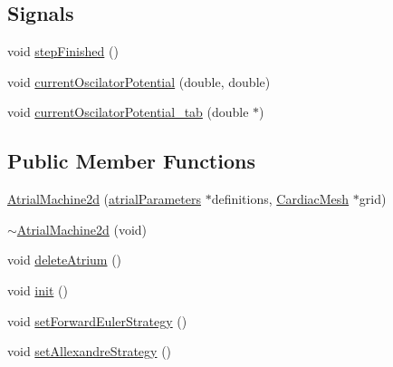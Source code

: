 \subsection*{Signals}
\begin{DoxyCompactItemize}
\item 
void \hyperlink{class_atrial_machine2d_aa0503c0b65de1d0a3353fa60001b7c7b}{step\+Finished} ()
\item 
void \hyperlink{class_atrial_machine2d_ab95917c203cf726da282efcfb26241a3}{current\+Oscilator\+Potential} (double, double)
\item 
void \hyperlink{class_atrial_machine2d_a8a2f2c40ae228ee8a2cf6f7457acfd28}{current\+Oscilator\+Potential\+\_\+tab} (double $\ast$)
\end{DoxyCompactItemize}
\subsection*{Public Member Functions}
\begin{DoxyCompactItemize}
\item 
\hyperlink{class_atrial_machine2d_a1181b8a58b70e0374cfaefcbf2c29b12}{Atrial\+Machine2d} (\hyperlink{classatrial_parameters}{atrial\+Parameters} $\ast$definitions, \hyperlink{class_cardiac_mesh}{Cardiac\+Mesh} $\ast$grid)
\item 
\hyperlink{class_atrial_machine2d_a955b6614307d86c8d9e196a3b7ce2434}{$\sim$\+Atrial\+Machine2d} (void)
\item 
void \hyperlink{class_atrial_machine2d_a40366613671e5856d0c3cd0572398dc1}{delete\+Atrium} ()
\item 
void \hyperlink{class_atrial_machine2d_a22a0e5a3d07859721cce24ed253932ed}{init} ()
\item 
void \hyperlink{class_atrial_machine2d_ab4833c86a56f23867915d876fac581e0}{set\+Forward\+Euler\+Strategy} ()
\item 
void \hyperlink{class_atrial_machine2d_af808c57f5af0c0c26aadcf4c812cb21f}{set\+Allexandre\+Strategy} ()
\end{DoxyCompactItemize}

